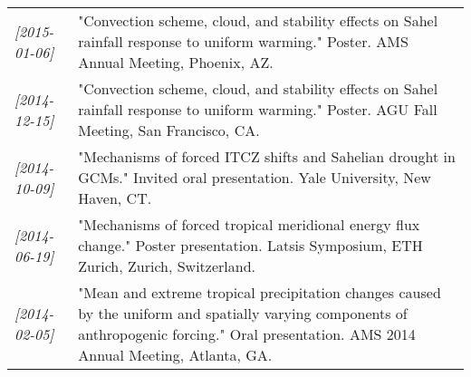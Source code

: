 \documentclass[12pt,letterpaper]{shillcv}
\begin{document}
\begin{center}
\begin{tabularx}{\textwidth}{lX}
\textit{[2015-01-06]} & "Convection scheme, cloud, and stability effects on Sahel rainfall response to uniform warming."  Poster.  AMS Annual Meeting, Phoenix, AZ.\\
\textit{[2014-12-15]} & "Convection scheme, cloud, and stability effects on Sahel rainfall response to uniform warming."  Poster.  AGU Fall Meeting, San Francisco, CA.\\
\textit{[2014-10-09]} & "Mechanisms of forced ITCZ shifts and Sahelian drought in GCMs."  Invited oral presentation.  Yale University, New Haven, CT.\\
\textit{[2014-06-19]} & "Mechanisms of forced tropical meridional energy flux change."  Poster presentation.  Latsis Symposium, ETH Zurich, Zurich, Switzerland.\\
\textit{[2014-02-05]} & "Mean and extreme tropical precipitation changes caused by the uniform and spatially varying components of anthropogenic forcing."  Oral presentation.  AMS 2014 Annual Meeting, Atlanta, GA.\\
\end{tabularx}
\end{center}
\end{document}
